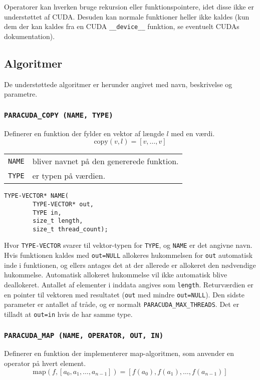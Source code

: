 Operatorer kan hverken bruge rekursion eller funktionspointere, idet disse ikke er understøttet af
CUDA. Desuden kan normale funktioner heller ikke kaldes (kun dem der kan kaldes fra en CUDA 
\verb|__device__| funktion, se eventuelt CUDAs dokumentation).


\subsection{Algoritmer}

De understøttede algoritmer er herunder angivet med navn, beskrivelse og parametre.

\subsubsection*{\texttt{PARACUDA\_COPY \scriptsize(NAME, TYPE)}}
Definerer en funktion der fylder en vektor af længde $l$ med en værdi.
\[
\mbox{copy}(v, l) = [v, \ldots, v]
\]

\noindent\begin{tabular}{rp{8cm}}
\texttt{NAME} & bliver navnet på den genererede funktion. \\
\texttt{TYPE} & er typen på værdien. \\
\end{tabular}\vspace{0.2cm}

\begin{verbatim}
TYPE-VECTOR* NAME(
        TYPE-VECTOR* out, 
        TYPE in, 
        size_t length, 
        size_t thread_count);
\end{verbatim}

Hvor \verb|TYPE-VECTOR| svarer til vektor-typen for \verb|TYPE|, og \verb|NAME| er det angivne navn. 
Hvis funktionen kaldes med \verb|out=NULL| allokeres hukommelsen 
for \verb|out| automatisk inde i funktionen, og ellers antages det at der allerede er 
allokeret den nødvendige hukommelse. Automatisk allokeret hukommelse vil ikke automatisk
blive deallokeret. Antallet af elementer i inddata angives som \verb|length|. 
Returværdien er en pointer til vektoren med resultatet (\verb|out| med mindre \verb|out=NULL|).
Den sidste parameter er antallet af tråde, og er normalt \verb|PARACUDA_MAX_THREADS|.
Det er tilladt at \verb|out=in| hvis de har samme type.

\subsubsection*{\texttt{PARACUDA\_MAP \scriptsize(NAME, OPERATOR, OUT, IN)}}
Definerer en funktion der implementerer map-algoritmen, som anvender en operator på hvert element.
\[
\mbox{map}(f, [a_0, a_1, \ldots, a_{n-1}]) = [f(a_0), f(a_1), \ldots, f(a_{n-1})]
\]

